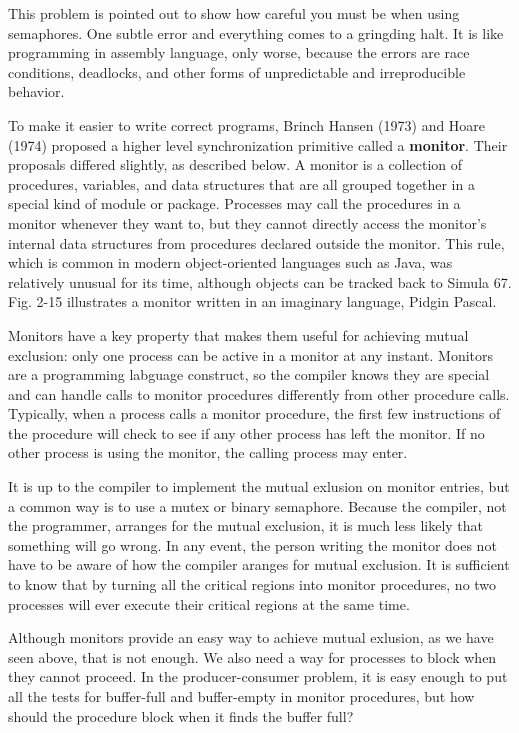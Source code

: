 \documentclass{book}
\newcommand {\kw}  [1] {\textbf{#1}}
\begin{document}
This problem is pointed out to show how careful you must be when using semaphores.
One subtle error and everything comes to a gringding halt.
It is like programming in assembly language, only worse, 
because the errors are race conditions, deadlocks, and other forms of unpredictable and irreproducible behavior.

To make it easier to write correct programs, Brinch Hansen (1973) and Hoare (1974) 
proposed a higher level synchronization primitive called a \kw{monitor}.
Their proposals differed slightly, as described below.
A monitor is a collection of procedures, variables, and data structures 
that are all grouped together in a special kind of module or package.
Processes may call the procedures in a monitor whenever they want to,
but they cannot directly access the monitor's internal data structures from procedures declared outside the monitor.
This rule, which is common in modern object-oriented languages such as Java, was relatively unusual for its time,
although objects can be tracked back to Simula 67.
Fig. 2-15 illustrates a monitor written in an imaginary language, Pidgin Pascal.

Monitors have a key property that makes them useful for achieving mutual exclusion: 
only one process can be active in a monitor at any instant.
Monitors are a programming labguage construct, so the compiler knows they are special 
and can handle calls to monitor procedures differently from other procedure calls.
Typically, when a process calls a monitor procedure, 
the first few instructions of the procedure will check to see if any other process has left the monitor.
If no other process is using the monitor, the calling process may enter.

It is up to the compiler to implement the mutual exlusion on monitor entries,
but a common way is to use a mutex or binary semaphore.
Because the compiler, not the programmer, arranges for the mutual exclusion, it is much less likely that something will go wrong.
In any event, the person writing the monitor does not have to be aware of how the compiler aranges for mutual exclusion.
It is sufficient to know that by turning all the critical regions into monitor procedures, 
no two processes will ever execute their critical regions at the same time.


Although monitors provide an easy way to achieve mutual exlusion, as we have seen above, that is not enough.
We also need a way for processes to block when they cannot proceed.
In the producer-consumer problem, it is easy enough to put all the tests for buffer-full and buffer-empty in monitor procedures,
but how should the procedure block when it finds the buffer full?
\end{document}

